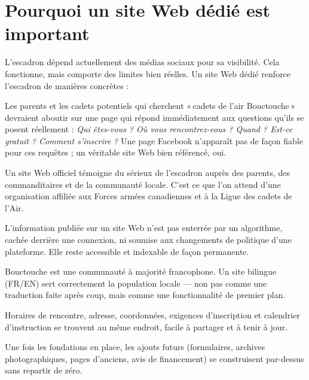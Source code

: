 \documentclass[11pt,letterpaper]{article}
\begin{document}
\section{Pourquoi un site Web dédié est important}

L'escadron dépend actuellement des médias sociaux pour sa visibilité. Cela fonctionne, mais comporte des limites bien réelles. Un site Web dédié renforce l'escadron de manières concrètes :

\begin{description}[style=nextline,leftmargin=1.4em,itemsep=0.4em]
  \item[Recrutement.] Les parents et les cadets potentiels qui cherchent «\,cadets de l'air Bouctouche\,» devraient aboutir sur une page qui répond immédiatement aux questions qu'ils se posent réellement : \emph{Qui êtes-vous ? Où vous rencontrez-vous ? Quand ? Est-ce gratuit ? Comment s'inscrire ?} Une page Facebook n'apparaît pas de façon fiable pour ces requêtes ; un véritable site Web bien référencé, oui.
  \item[Crédibilité.] Un site Web officiel témoigne du sérieux de l'escadron auprès des parents, des commanditaires et de la communauté locale. C'est ce que l'on attend d'une organisation affiliée aux Forces armées canadiennes et à la Ligue des cadets de l'Air.
  \item[Indépendance face aux plateformes sociales.] L'information publiée sur un site Web n'est pas enterrée par un algorithme, cachée derrière une connexion, ni soumise aux changements de politique d'une plateforme. Elle reste accessible et indexable de façon permanente.
  \item[Service bilingue.] Bouctouche est une communauté à majorité francophone. Un site bilingue (FR/EN) sert correctement la population locale --- non pas comme une traduction faite après coup, mais comme une fonctionnalité de premier plan.
  \item[Source d'information unique.] Horaires de rencontre, adresse, coordonnées, exigences d'inscription et calendrier d'instruction se trouvent au même endroit, facile à partager et à tenir à jour.
  \item[Une plateforme qui grandit avec l'escadron.] Une fois les fondations en place, les ajouts futurs (formulaires, archives photographiques, pages d'anciens, avis de financement) se construisent par-dessus sans repartir de zéro.
\end{description}
\end{document}
